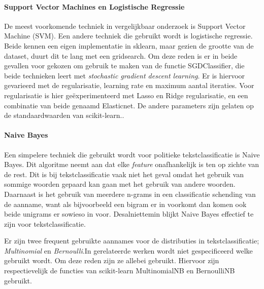 \paragraph{Support Vector Machines en Logistische Regressie}
De meest voorkomende techniek in vergelijkbaar onderzoek is Support Vector Machine (SVM). Een andere techniek die gebruikt wordt is logistische regressie. Beide kennen een eigen implementatie in sklearn, maar gezien de grootte van de dataset, duurt dit te lang met een gridsearch. Om deze reden is er in beide gevallen voor gekozen om gebruik te maken van de functie SGDClassifier, die beide technieken leert met \textit{stochastic gradient descent learning}. Er is hiervoor gevarieerd met de regularisatie, learning rate en maximum aantal iteraties. Voor regularisatie is hier geëxperimenteerd met Lasso en Ridge regularisatie, en een combinatie van beide genaamd Elasticnet. De andere parameters zijn gelaten op de standaardwaarden van scikit-learn.\cite{scikit-learn}.\par

\paragraph{Naive Bayes}
Een simpelere techniek die gebruikt wordt voor politieke tekstclassificatie is Naive Bayes. Dit algoritme neemt aan dat elke \textit{feature} onafhankelijk is ten op zichte van de rest. Dit is bij tekstclassificatie vaak niet het geval omdat het gebruik van sommige woorden gepaard kan gaan met het gebruik van andere woorden. Daarnaast is het gebruik van meerdere n-grams in een classificatie schending van de aanname, want als bijvoorbeeld een bigram er in voorkomt dan komen ook beide unigrams er sowieso in voor. Desalniettemin blijkt Naive Bayes effectief te zijn voor tekstclassificatie\cite{scikit-learn,bhand}. \par
Er zijn twee frequent gebruikte aannames voor de distributies in tekstclassificatie; \textit{Multinomial} en \textit{Bernoulli}.In gerelateerde werken wordt niet gespecificeerd welke gebruikt wordt. Om deze reden zijn ze allebei gebruikt. Hiervoor zijn respectievelijk de functies van scikit-learn MultinomialNB en BernoulliNB gebruikt.\cite{scikit-learn,bhand}\par

